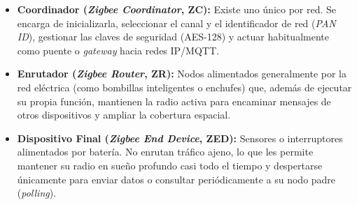 \documentclass[../main.tex]{subfiles}
\begin{document}
                \begin{itemize}
                    \item \textbf{Coordinador (\emph{Zigbee Coordinator}, ZC):} Existe uno único por red. Se encarga de inicializarla, seleccionar el canal y el identificador de red (\emph{PAN ID}), gestionar las claves de seguridad (AES-128) y actuar habitualmente como puente o \emph{gateway} hacia redes IP/MQTT.
                    \item \textbf{Enrutador (\emph{Zigbee Router}, ZR):} Nodos alimentados generalmente por la red eléctrica (como bombillas inteligentes o enchufes) que, además de ejecutar su propia función, mantienen la radio activa para encaminar mensajes de otros dispositivos y ampliar la cobertura espacial.
                    \item \textbf{Dispositivo Final (\emph{Zigbee End Device}, ZED):} Sensores o interruptores alimentados por batería. No enrutan tráfico ajeno, lo que les permite mantener su radio en sueño profundo casi todo el tiempo y despertarse únicamente para enviar datos o consultar periódicamente a su nodo padre (\emph{polling}).
                \end{itemize}
\end{document}
